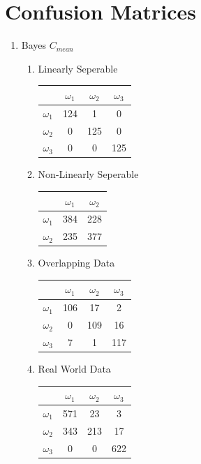 \documentclass[a4paper]{article}
\begin{document}
\section{Confusion Matrices}
\begin{enumerate}
\item Bayes $C_{mean}$

\begin{multicols}{2}
\begin{enumerate}
\item Linearly Seperable

\begin{tabular}{ l | c | c | c | }

& $\omega_1$ & $\omega_2$ & $\omega_3$ \\
\hline
  $\omega_1$ & 124 & 1 & 0 \\ 
\hline
  $\omega_2$ & 0 & 125 & 0 \\
\hline
  $\omega_3$ & 0 & 0 & 125 \\
\hline
\end{tabular}


\item Non-Linearly Seperable

\begin{tabular}{ l | c | c |}

& $\omega_1$ & $\omega_2$ \\
\hline
  $\omega_1$ & 384 & 228 \\ 
\hline
  $\omega_2$ & 235 & 377 \\
\hline
\end{tabular}
\newline

\item Overlapping Data

\begin{tabular}{ l | c | c | c | }
& $\omega_1$ & $\omega_2$ & $\omega_3$ \\
\hline
  $\omega_1$ & 106 & 17 & 2 \\ 
\hline
  $\omega_2$ & 0 & 109 & 16 \\
\hline
  $\omega_3$ & 7 & 1 & 117 \\
\hline
\end{tabular}

\item Real World Data

\begin{tabular}{ l | c | c | c | }
& $\omega_1$ & $\omega_2$ & $\omega_3$ \\
\hline
  $\omega_1$ & 571 & 23 & 3 \\ 
\hline
  $\omega_2$ & 343 & 213 & 17 \\
\hline
  $\omega_3$ & 0 & 0 & 622 \\
\hline
\end{tabular}
\end{enumerate}
\end{multicols}


\end{enumerate}
\end{document}
